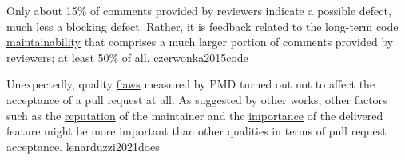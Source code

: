 \documentclass{article}
\begin{document}



  {Only about 15\% of comments provided by reviewers indicate a possible defect, much less a blocking defect. Rather, it is feedback related to the long-term code \ul{maintainability} that comprises a much larger portion of comments provided by reviewers; at least 50\% of all.}
  {czerwonka2015code}

  {Unexpectedly, quality \ul{flaws} measured by PMD turned out not to affect the acceptance of a pull request at all. As suggested by other works, other factors such as the \ul{reputation} of the maintainer and the \ul{importance} of the delivered feature might be more important than other qualities in terms of pull request acceptance.}
  {lenarduzzi2021does}

\end{document}
